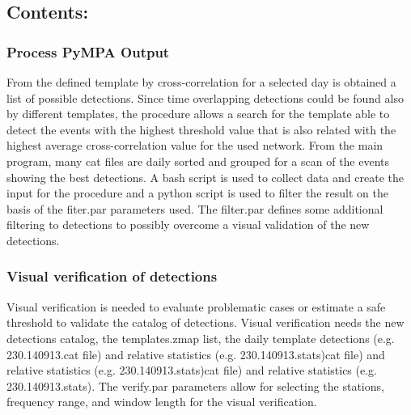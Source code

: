 \documentclass[a4paper,10pt,english]{sphinxmanual}
\begin{document}
\subsection{Contents:}
\label{\detokenize{output:contents}}

\subsubsection{Process PyMPA Output}
\label{\detokenize{sub/output.process_detections:process-pympa-output}}\label{\detokenize{sub/output.process_detections::doc}}
From the defined template by cross-correlation for a selected day is obtained a list of possible detections.
Since time overlapping detections could be found also by different templates, the procedure allows a search for
the template able to detect the events with the highest threshold value that is also related with the highest
average cross-correlation value for the used network. From the main program, many cat files are daily sorted
and grouped for a scan of the events showing the best detections. A bash script is used to collect data and create the input for the procedure
and a python script is used to filter the result on the basis of the fiter.par parameters used. The filter.par defines
some additional filtering to detections to possibly overcome a visual validation of the new detections.


\subsubsection{Visual verification of detections}
\label{\detokenize{sub/output.verify_detection:visual-verification-of-detections}}\label{\detokenize{sub/output.verify_detection::doc}}
Visual verification is needed to evaluate problematic cases or estimate a
safe threshold to validate the catalog of detections. Visual verification needs the new detections
catalog, the templates.zmap list, the daily template detections (e.g. 230.140913.cat file) and relative
statistics (e.g. 230.140913.stats)cat file) and relative
statistics (e.g. 230.140913.stats)cat file) and relative
statistics (e.g. 230.140913.stats). The verify.par parameters allow for selecting the stations, frequency range,
and window length for the visual verification.



\renewcommand{\indexname}{Index}
\printindex
\end{document}
